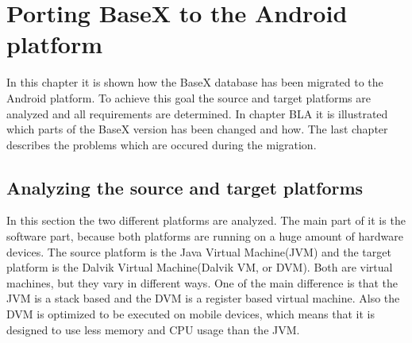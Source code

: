 \chapter{Porting BaseX to the Android platform}
\label{sec:migration:porting-basex-to-android}
In this chapter it is shown how the BaseX database has been migrated to the Android platform.
To achieve this goal the source and target platforms are analyzed and all requirements are determined.
In chapter BLA it is illustrated which parts of the BaseX version has been changed and how.
The last chapter describes the problems which are occured during the migration.


\section{Analyzing the source and target platforms} 
\label{sec:migration:analysing-the-source-and-target-platform}
In this section the two different platforms are analyzed.
The main part of it is the software part, because both platforms are running on a huge amount of hardware devices.
The source platform is the Java Virtual Machine(JVM) and the target platform is the Dalvik Virtual Machine(Dalvik VM, or DVM).
Both are virtual machines, but they vary in different ways.
One of the main difference is that the JVM is a stack based and the DVM is a register based virtual machine.
Also the DVM is optimized to be executed on mobile devices, which means that it is designed to use less memory and CPU usage than the JVM.


